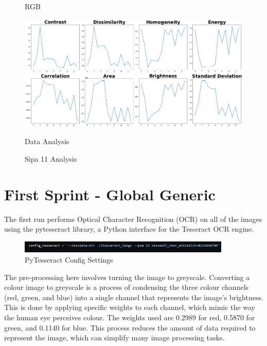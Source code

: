 \begin{figure}[ht]
\begin{minipage}[t]{0.25\textwidth}
        \caption*{RGB}
    \end{minipage}\hfill
    \begin{minipage}[t]{0.50\textwidth}
        \centering
        \includegraphics[width=\textwidth]{Figures/EDA_Charts/11/da.png}
        \caption*{Data Analysis}
    \end{minipage}
    \caption{Sipa 11 Analysis}
    \label{fig:Sipa 11 Analysis}
\end{figure}


\newpage

\section{First Sprint - Global Generic}

The first run performs Optical Character Recognition (OCR) on all of the images using the pytesseract library, a Python interface for the Tesseract OCR engine.

\begin{figure}[ht]
    \centering
    \includegraphics[width=0.9\textwidth]{Figures/firstrun/tesseract_config.jpg}
    \caption[PyTesseract Config Settings]{PyTesseract Config Settings}
    \label{fig:PyTesseract Config Settings}
\end{figure}


The pre-processing here involves turning the image to greyscale. Converting a colour image to greyscale is a process of condensing the three colour channels (red, green, and blue) into a single channel that represents the image's brightness. This is done by applying specific weights to each channel, which mimic the way the human eye perceives colour. The weights used are 0.2989 for red, 0.5870 for green, and 0.1140 for blue. This process reduces the amount of data required to represent the image, which can simplify many image processing tasks. \cite{cadikPerceptualEvaluationColortoGrayscale2008}


